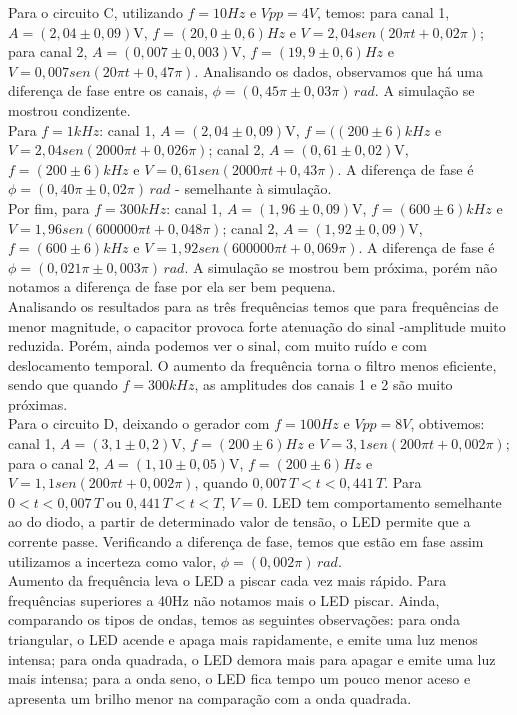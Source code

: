 \documentclass[a4paper, 11pt]{article}
\begin{document}
Para o circuito C, utilizando $f = 10Hz$ e $Vpp = 4V$, temos: para  canal 1, $A = (2,04 \pm 0,09)$V, $f = (20,0 \pm 0,6)Hz$ e $V = 2,04sen(20 \pi t + 0,02 \pi)$; para canal 2, $A = (0,007 \pm 0,003)$V, $f = (19,9 \pm 0,6)Hz$ e $V = 0,007sen(20\pi t + 0,47 \pi)$. Analisando os dados, observamos que há uma diferença de fase entre os canais, $\phi = (0,45 \pi \pm 0,03 \pi) \, rad $. A simulação se mostrou condizente.\\

Para $f = 1kHz$: canal 1, $A = (2,04 \pm 0,09)$V, $f = ((200 \pm 6)kHz$ e $V=2,04sen(2000 \pi t + 0,026 \pi )$; canal 2, $A = (0,61 \pm 0,02)$V, $f = (200 \pm 6)kHz$ e $V=0,61sen(2000 \pi t + 0,43 \pi )$. A diferença de fase é $\phi = (0,40 \pi  \pm 0,02 \pi ) \, rad$ - semelhante à simulação.\\

Por fim, para $f = 300kHz$: canal 1, $A = (1,96 \pm 0,09)$V, $f = (600 \pm 6)kHz$ e $V = 1,96sen(600000 \pi t + 0,048 \pi )$; canal 2, $A = (1,92 \pm 0,09)$V, $f = (600 \pm 6)kHz$ e $V= 1,92sen(600000 \pi t + 0,069 \pi )$. A diferença de fase é   $\phi  = (0,021 \pi \pm 0,003 \pi ) \, rad$. A simulação se mostrou bem próxima, porém não notamos a diferença de fase por ela ser bem pequena.\\

Analisando os resultados para as três frequências temos que para frequências de menor magnitude, o capacitor provoca forte atenuação do sinal -amplitude muito reduzida. Porém, ainda podemos ver o sinal, com muito ruído e com deslocamento temporal. O aumento da frequência torna o filtro menos eficiente, sendo que quando $f = 300kHz$, as amplitudes dos canais 1 e 2 são muito próximas. \\

Para o circuito D, deixando o gerador com $f = 100Hz$ e $Vpp = 8V$, obtivemos: canal 1, $A = (3,1   \pm  0,2)$V, $f = (200   \pm  6)Hz$ e $V = 3,1sen(200  \pi t + 0,002  \pi )$; para o canal 2, $A = (1,10   \pm  0,05)$V, $f = (200   \pm  6)Hz$ e $V = 1,1sen(200  \pi t + 0,002  \pi )$, quando $0,007 \, T < t < 0,441 \, T$. Para $ 0 < t < 0,007 \, T$ ou $0,441 \, T < t < T$, $V = 0$. LED tem comportamento semelhante ao do diodo, a partir de determinado valor de tensão, o LED permite que a corrente passe. Verificando a diferença de fase, temos que estão em fase assim utilizamos a incerteza como valor, $\phi = (0,002\pi) \,rad$.\\

Aumento da frequência leva o LED a piscar cada vez mais rápido. Para frequências superiores a 40Hz não notamos mais o LED piscar. Ainda, comparando os tipos de ondas, temos as seguintes observações: para onda triangular, o LED acende e apaga mais rapidamente, e emite uma luz menos intensa; para onda quadrada, o LED demora mais para apagar e emite uma luz mais intensa; para a onda seno, o LED fica tempo um pouco menor aceso e apresenta um brilho menor na comparação com a onda quadrada. \\
\end{document}
